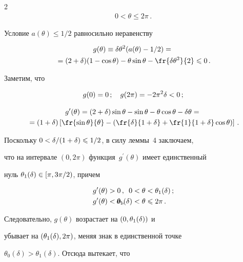 \begin{multicols}{2}
\begin{multline*}
0<\theta\le2\pi\,.

\end{multline*}



Условие $a(\theta)\le 1/2$ равносильно неравенству

\begin{multline*}

g(\theta)\equiv\d\theta^2(a(\theta)-1/2)={}\\

{}=

(2+\d)(1-\cos\theta)-\theta\sin\theta-\fr{\d\theta^2}{2} \le 0\,.

\end{multline*}

Заметим, что

$$

g(0)=0\,;\quad g(2\pi)=-2\pi^2\d<0\,;

$$

\begin{multline*}

g^\prime(\theta)=(2+\d)\sin\theta-\sin\theta-\theta\cos\theta-\d\theta={}\\

{}=(1+\d)\left[\fr{\sin

\theta}{\theta}-\left(\fr{\d}{1+\d}+\fr{1}{1+\d}\cos \theta\right)\right]\,.

\end{multline*}

Поскольку $0<\delta/(1+\delta)\leqslant1/2$, в силу леммы~4 заключаем,

что на интервале $(0,2\pi)$ функция~$g^\prime(\theta)$ имеет единственный

нуль $\theta_1(\delta)\in[\pi,3\pi/2)$, причем

\begin{align*}

  g^\prime(\theta)&>0\,, &\hspace*{-20pt} 0&<\theta<\theta_1(\d)\,; \\

  g^\prime(\theta)&<0\,, &\hspace*{-20pt} \theta_1(\d)&<\theta\le2\pi\,.

\end{align*}

Следовательно, $g(\theta)$ возрастает на $(0,\theta_1(\delta))$ и

убывает на $(\theta_1(\delta),2\pi)$, меняя знак в единственной точке

${\theta_0(\delta)>\theta_1(\delta)}$. Отсюда вытекает, что


\end{multicols}
